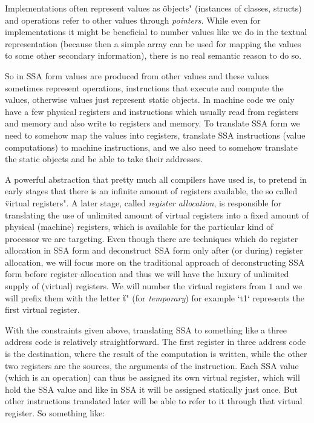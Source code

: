 Implementations often represent values as \"objects" (instances of classes,
structs) and operations refer to other values through {\em pointers}. While even
for implementations it might be beneficial to number values like we do in the
textual representation (because then a simple array can be used for mapping the
values to some other secondary information), there is no real semantic reason to
do so.

So in SSA form values are produced from other values and these values sometimes
represent operations, instructions that execute and compute the values,
otherwise values just represent static objects. In machine code we only have
a few physical registers and instructions which usually read from registers and
memory and also write to registers and memory. To translate SSA form we need to
somehow map the values into registers, translate SSA instructions (value
computations) to machine instructions, and we also need to somehow translate the
static objects and be able to take their addresses.

A powerful abstraction that pretty much all compilers have used is, to pretend
in early stages that there is an infinite amount of registers available, the so
called \"virtual registers". A later stage, called {\em register
allocation}, is responsible for translating the use of unlimited amount of
virtual registers into a fixed amount of physical (machine) registers, which is
available for the particular kind of processor we are targeting. Even though
there are techniques which do register allocation in SSA form and deconstruct
SSA form only after (or during) register allocation, we will focus more on the
traditional approach of deconstructing SSA form before register allocation and
thus we will have the luxury of unlimited supply of (virtual) registers. We will
number the virtual registers from $1$ and we will prefix them with the letter
\"t" (for {\em temporary}) for
example `t1` represents the first virtual register.

With the constraints given above, translating SSA to something like a three
address code is relatively straightforward. The first register in three address
code is the destination, where the result of the computation is written, while
the other two registers are the sources, the arguments of the instruction. Each
SSA value (which is an operation) can thus be assigned its own virtual register,
which will hold the SSA value and like in SSA it will be assigned statically
just once. But other instructions translated later will be able to refer to
it through that virtual register. So something like:


